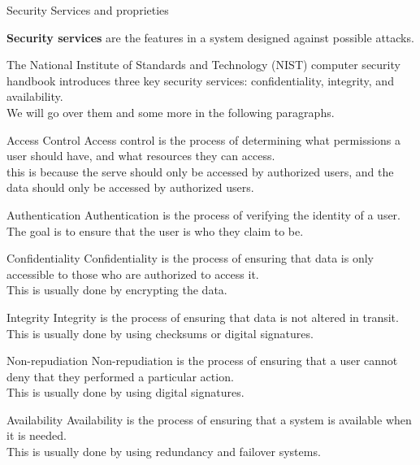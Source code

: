 \begin{section}{Security Services and proprieties}
  \begin{boxH}
    \textbf{Security services} are the features in a system designed against possible attacks.
  \end{boxH}
  The National Institute of Standards and Technology (NIST) computer security handbook introduces 
  three key security services: confidentiality, integrity, and availability.\\
  We will go over them and some more in the following paragraphs.
  \begin{paragraph}{Access Control}
    Access control is the process of determining what permissions a user should have, and what 
    resources they can access.\\
    this is because the serve should only be accessed by authorized users, and the data should only
    be accessed by authorized users.
  \end{paragraph}
  \begin{paragraph}{Authentication}
    Authentication is the process of verifying the identity of a user.\\
    The goal is to ensure that the user is who they claim to be.
  \end{paragraph}
  \begin{paragraph}{Confidentiality}
    Confidentiality is the process of ensuring that data is only accessible to those who are authorized
    to access it.\\
    This is usually done by encrypting the data.
  \end{paragraph}
  \begin{paragraph}{Integrity}
    Integrity is the process of ensuring that data is not altered in transit.\\
    This is usually done by using checksums or digital signatures.
  \end{paragraph}
  \begin{paragraph}{Non-repudiation}
    Non-repudiation is the process of ensuring that a user cannot deny that they performed a 
    particular action.\\
    This is usually done by using digital signatures.
  \end{paragraph}
  \begin{paragraph}{Availability}
    Availability is the process of ensuring that a system is available when it is needed.\\
    This is usually done by using redundancy and failover systems.
  \end{paragraph}

\end{section}
